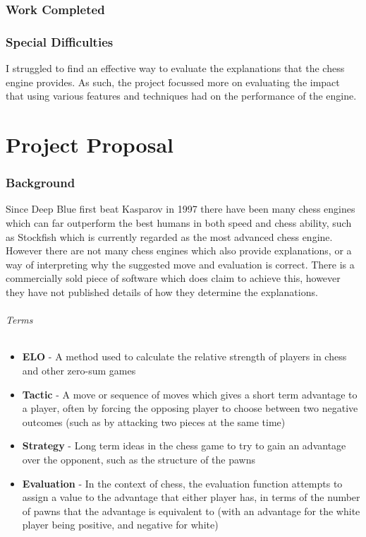 \documentclass[12pt,a4paper]{article}
\begin{document}
\section*{Work Completed}


\section*{Special Difficulties}
I struggled to find an effective way to evaluate the explanations that the chess engine provides. As such, the project focussed more on evaluating the impact that using various features and techniques had on the performance of the engine.

\pagebreak

\part*{Project Proposal}

\section*{Background}
Since Deep Blue first beat Kasparov in 1997 there have been many chess engines which can far outperform the best humans in both speed and chess ability, such as Stockfish which is currently regarded as the most advanced chess engine. However there are not many chess engines which also provide explanations, or a way of interpreting why the suggested move and evaluation is correct. There is a commercially sold piece of software which does claim to achieve this, however they have not published details of how they determine the explanations.

\paragraph*{Terms}
\begin{itemize}
    \item \textbf{ELO} - A method used to calculate the relative strength of players in chess and other zero-sum games
    \item \textbf{Tactic} - A move or sequence of moves which gives a short term advantage to a player, often by forcing the opposing player to choose between two negative outcomes (such as by attacking two pieces at the same time)
    \item \textbf{Strategy} - Long term ideas in the chess game to try to gain an advantage over the opponent, such as the structure of the pawns
    \item \textbf{Evaluation} - In the context of chess, the evaluation function attempts to assign a value to the advantage that either player has, in terms of the number of pawns that the advantage is equivalent to (with an advantage for the white player being positive, and negative for white)
\end{itemize}
\end{document}
